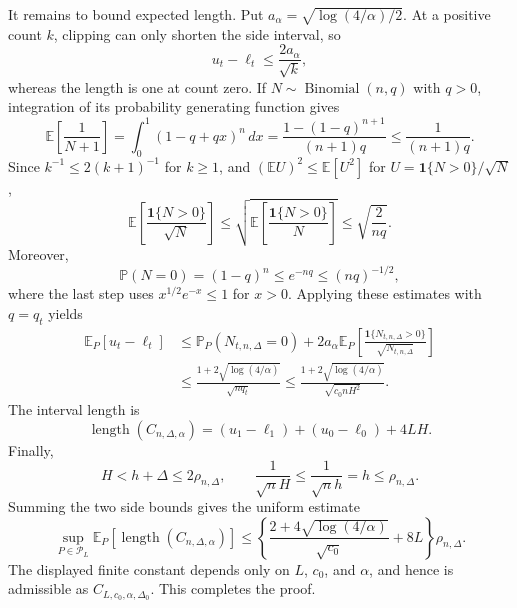 It remains to bound expected length.  Put \(a_\alpha=\sqrt{\log(4/\alpha)/2}\).  At a positive count \(k\), clipping can only shorten the side interval, so
\[
 u_t-\ell_t\leq\frac{2a_\alpha}{\sqrt{k}},
\]
whereas the length is one at count zero.  If \(N\sim\operatorname{Binomial}(n,q)\) with \(q>0\), integration of its probability generating function gives
\[
 \mathbb E\!\left[\frac1{N+1}\right]
 =\int_0^1(1-q+qx)^n\,dx
 =\frac{1-(1-q)^{n+1}}{(n+1)q}
 \leq\frac1{(n+1)q}.
\]
Since \(k^{-1}\leq2(k+1)^{-1}\) for \(k\geq1\), and \((\mathbb E U)^2\leq\mathbb E[U^2]\) for \(U=\mathbf1\{N>0\}/\sqrt N\),
\[
 \mathbb E\!\left[\frac{\mathbf1\{N>0\}}{\sqrt N}\right]
 \leq\sqrt{\mathbb E\!\left[\frac{\mathbf1\{N>0\}}N\right]}
 \leq\sqrt{\frac2{nq}}.
\]
Moreover,
\[
 \mathbb P(N=0)=(1-q)^n\leq e^{-nq}\leq(nq)^{-1/2},
\]
where the last step uses \(x^{1/2}e^{-x}\leq1\) for \(x>0\).  Applying these estimates with \(q=q_t\) yields
\[
 \begin{aligned}
 \mathbb E_P[u_t-\ell_t]
 &\leq \mathbb P_P(N_{t,n,\Delta}=0)
   +2a_\alpha\mathbb E_P\!\left[
      \frac{\mathbf1\{N_{t,n,\Delta}>0\}}{\sqrt{N_{t,n,\Delta}}}
    \right]\\
 &\leq\frac{1+2\sqrt{\log(4/\alpha)}}{\sqrt{nq_t}}
 \leq\frac{1+2\sqrt{\log(4/\alpha)}}{\sqrt{c_0nH^2}}.
 \end{aligned}
\]
The interval length is
\[
 \operatorname{length}(C_{n,\Delta,\alpha})
 =(u_1-\ell_1)+(u_0-\ell_0)+4LH.
\]
Finally,
\[
 H<h+\Delta\leq2\rho_{n,\Delta},
 \qquad
 \frac1{\sqrt nH}\leq\frac1{\sqrt nh}=h\leq\rho_{n,\Delta}.
\]
Summing the two side bounds gives the uniform estimate
\[
 \sup_{P\in\mathcal P_L}\mathbb E_P[\operatorname{length}(C_{n,\Delta,\alpha})]
 \leq
 \left\{
 \frac{2+4\sqrt{\log(4/\alpha)}}{\sqrt{c_0}}+8L
 \right\}\rho_{n,\Delta}.
\]
The displayed finite constant depends only on \(L\), \(c_0\), and \(\alpha\), and hence is admissible as \(C_{L,c_0,\alpha,\Delta_0}\).  This completes the proof.